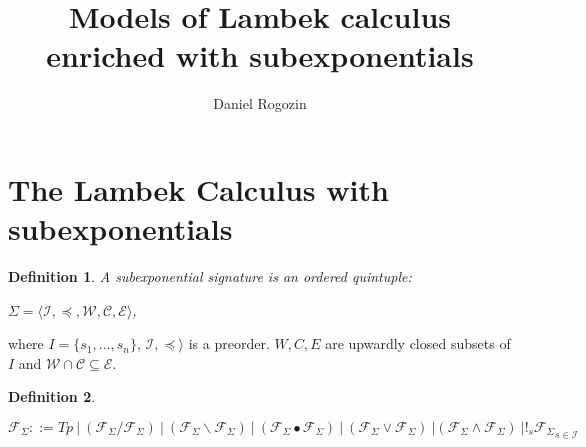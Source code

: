 \documentclass[a4paper]{article}
\date{}
\author[1,2]{Daniel Rogozin}
\affil[1]{Lomonosov Moscow State University}
\affil[2]{Serokell O\"{U}}
\title{Models of Lambek calculus enriched with subexponentials}
\theoremstyle{defin}
\newtheorem{defin}{Definition}
\theoremstyle{theorem}
\theoremstyle{prop}
\theoremstyle{lemma}
\theoremstyle{ex}
\theoremstyle{col}
\begin{document}
\maketitle

\begin{abstract}
\end{abstract}

\section{The Lambek Calculus with subexponentials}

\begin{defin} A subexponential signature is an ordered quintuple:

  $\Sigma = \langle \mathcal{I}, \preceq, \mathcal{W}, \mathcal{C}, \mathcal{E} \rangle$,
\end{defin}

where $I = \{ s_1, \dots, s_n\}$, $\mathcal{I}, \preceq \rangle$ is a preorder.
$W, C, E$ are upwardly closed subsets of $I$ and $\mathcal{W} \cap \mathcal{C} \subseteq \mathcal{E}$.


\begin{defin}
$ $

  $\mathcal{F}_{\Sigma} ::= Tp \: | \: (\mathcal{F}_{\Sigma} / \mathcal{F}_{\Sigma}) \: | \: (\mathcal{F}_{\Sigma} \backslash \mathcal{F}_{\Sigma}) \: | \: (\mathcal{F}_{\Sigma} \bullet \mathcal{F}_{\Sigma}) \: | \: (\mathcal{F}_{\Sigma} \lor \mathcal{F}_{\Sigma}) \: | (\mathcal{F}_{\Sigma} \land \mathcal{F}_{\Sigma}) \: | {!_s \mathcal{F}_{\Sigma}}_{s \in \mathcal{I}} $
\end{defin}
\end{document}
